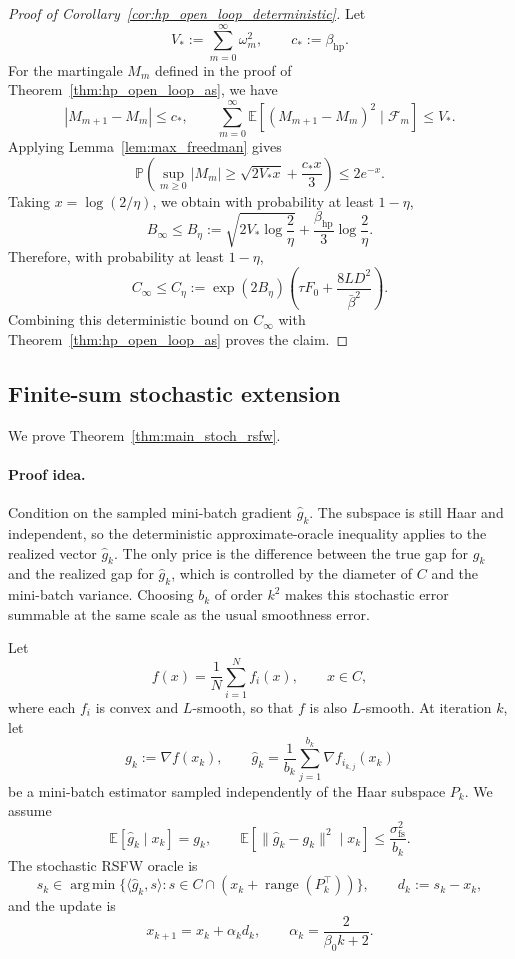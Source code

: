 \documentclass{article}
\DeclareMathOperator*{\argmin}{arg\,min}
\DeclareMathOperator{\range}{range}
\begin{document}
\begin{proof}[Proof of Corollary~\ref{cor:hp_open_loop_deterministic}]
Let
\[
V_*:=\sum_{m=0}^{\infty}\omega_m^2,
\qquad
c_*:=\beta_{\mathrm{hp}}.
\]
For the martingale \(M_m\) defined in the proof of
Theorem~\ref{thm:hp_open_loop_as}, we have
\[
|M_{m+1}-M_m|\le c_*,
\qquad
\sum_{m=0}^{\infty}
\mathbb E\!\left[(M_{m+1}-M_m)^2\mid\mathcal F_m\right]
\le V_*.
\]
Applying Lemma~\ref{lem:max_freedman} gives
\[
\mathbb P\!\left(
\sup_{m\ge0}|M_m|
\ge
\sqrt{2V_*x}+\frac{c_*x}{3}
\right)
\le
2e^{-x}.
\]
Taking \(x=\log(2/\eta)\), we obtain with probability at least \(1-\eta\),
\[
B_\infty
\le
B_\eta
:=
\sqrt{2V_*\log\frac2\eta}
+
\frac{\beta_{\mathrm{hp}}}{3}
\log\frac2\eta.
\]
Therefore, with probability at least \(1-\eta\),
\[
C_\infty
\le
C_\eta
:=
\exp(2B_\eta)
\left(
\tau F_0+\frac{8LD^2}{\bar\beta^2}
\right).
\]
Combining this deterministic bound on \(C_\infty\) with
Theorem~\ref{thm:hp_open_loop_as} proves the claim.
\end{proof}



\subsection{Finite-sum stochastic extension}
\label{app:finite_sum_stochastic}

We prove Theorem~\ref{thm:main_stoch_rsfw}.

\paragraph{Proof idea.}
Condition on the sampled mini-batch gradient \(\widehat g_k\). The subspace is
still Haar and independent, so the deterministic approximate-oracle inequality
applies to the realized vector \(\widehat g_k\). The only price is the
difference between the true gap for \(g_k\) and the realized gap for
\(\widehat g_k\), which is controlled by the diameter of \(C\) and the
mini-batch variance. Choosing \(b_k\) of order \(k^2\) makes this stochastic
error summable at the same scale as the usual smoothness error.

Let
\[
f(x)=\frac1N\sum_{i=1}^N f_i(x),
\qquad x\in C,
\]
where each \(f_i\) is convex and \(L\)-smooth, so that \(f\) is also
\(L\)-smooth. At iteration \(k\), let
\[
g_k:=\nabla f(x_k),
\qquad
\widehat g_k
=
\frac1{b_k}\sum_{j=1}^{b_k}\nabla f_{i_{k,j}}(x_k)
\]
be a mini-batch estimator sampled independently of the Haar subspace
\(P_k\). We assume
\[
\mathbb E[\widehat g_k\mid x_k]=g_k,
\qquad
\mathbb E[\|\widehat g_k-g_k\|^2\mid x_k]
\le
\frac{\sigma_{\mathrm{fs}}^2}{b_k}.
\]
The stochastic RSFW oracle is
\[
s_k\in
\argmin\{\langle \widehat g_k,s\rangle:
s\in C\cap(x_k+\range(P_k^\top))\},
\qquad
d_k:=s_k-x_k,
\]
and the update is
\[
x_{k+1}=x_k+\alpha_kd_k,
\qquad
\alpha_k=\frac{2}{\beta_0 k+2}.
\]
\end{document}
